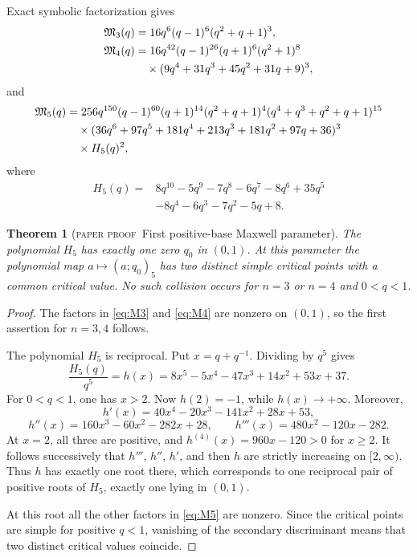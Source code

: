 \documentclass[11pt,oneside]{article}
\newtheorem{theorem}{Theorem}[section]
\theoremstyle{definition}
\theoremstyle{remark}
\theoremstyle{plain}
\theoremstyle{definition}
\theoremstyle{remark}
\newcommand{\statusproved}{\textcolor{provedgreen}{\textsc{paper proof}}}
\numberwithin{equation}{section}
\numberwithin{figure}{section}
\numberwithin{table}{section}
\begin{document}
Exact symbolic factorization gives
\begin{align}
 \mathfrak M_3(q)
 &=16q^6(q-1)^6(q^2+q+1)^3,\label{eq:M3}\\
 \mathfrak M_4(q)
 &=16q^{42}(q-1)^{26}(q+1)^6(q^2+1)^8\notag\\
 &\quad\times(9q^4+31q^3+45q^2+31q+9)^3,\label{eq:M4}
\end{align}
and
\begin{align}
 \mathfrak M_5(q)
 &=256q^{150}(q-1)^{60}(q+1)^{14}(q^2+q+1)^4
 (q^4+q^3+q^2+q+1)^{15}\notag\\
 &\quad\times
 (36q^6+97q^5+181q^4+213q^3+181q^2+97q+36)^3\notag\\
 &\quad\times H_5(q)^2,\label{eq:M5}
\end{align}
where
\begin{equation}
\begin{split}
 H_5(q)={}&8q^{10}-5q^9-7q^8-6q^7-8q^6+35q^5\\
          &-8q^4-6q^3-7q^2-5q+8.
\end{split}
\label{eq:H5}
\end{equation}

\begin{theorem}[\statusproved\ First positive-base Maxwell parameter]
The polynomial \(H_5\) has exactly one zero \(q_0\) in \((0,1)\).  At this
parameter the polynomial map \(a\mapsto(a;q_0)_5\) has two distinct simple
critical points with a common critical value.  No such collision occurs for
\(n=3\) or \(n=4\) and \(0<q<1\).
\end{theorem}
\begin{proof}
The factors in \eqref{eq:M3} and \eqref{eq:M4} are nonzero on \((0,1)\), so the
first assertion for \(n=3,4\) follows.

The polynomial \(H_5\) is reciprocal.  Put \(x=q+q^{-1}\).  Dividing by
\(q^5\) gives
\[
 \frac{H_5(q)}{q^5}=h(x)
 =8x^5-5x^4-47x^3+14x^2+53x+37.
\]
For \(0<q<1\), one has \(x>2\).  Now \(h(2)=-1\), while \(h(x)\to+\infty\).
Moreover,
\[
 h'(x)=40x^4-20x^3-141x^2+28x+53,
\]
\[
 h''(x)=160x^3-60x^2-282x+28,
\qquad
 h'''(x)=480x^2-120x-282.
\]
At \(x=2\), all three are positive, and
\(h^{(4)}(x)=960x-120>0\) for \(x\ge2\).  It follows successively that
\(h'''\), \(h''\), \(h'\), and then \(h\) are strictly increasing on
\([2,\infty)\).  Thus \(h\) has exactly one root there, which corresponds to
one reciprocal pair of positive roots of \(H_5\), exactly one lying in
\((0,1)\).

At this root all the other factors in \eqref{eq:M5} are nonzero.  Since the
critical points are simple for positive \(q<1\), vanishing of the secondary
discriminant means that two distinct critical values coincide.
\end{proof}
\end{document}
